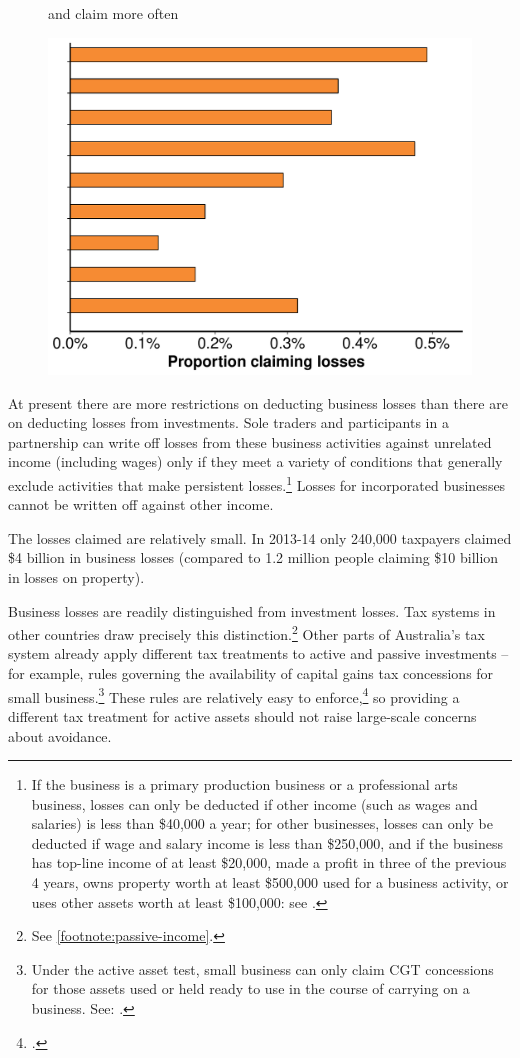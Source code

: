 \begin{figure}[t]
\caption*{and claim more often}
\includegraphics[width=0.8\columnwidth]{CGT-NG-atlas/Proportions-PP-losses-1.pdf}
\caption*{}
\end{figure}

At present there are more restrictions on deducting business losses than there are on deducting losses from investments. Sole traders and participants in a partnership can write off losses from these business activities against unrelated income (including wages) only if they meet a variety of conditions that generally exclude activities that make persistent losses.\footnote{If the business is a primary production business or a professional arts business, losses can only be deducted if other income (such as wages and salaries) is less than \$40,000 a year; for other businesses, losses can only be deducted if wage and salary income is less than \$250,000, and if the business has top-line income of at least \$20,000, made a profit in three of the previous 4 years, owns property worth at least \$500,000 used for a business activity, or uses other assets worth at least \$100,000: see \textcite{ATO2015OffsettingCurrentYearLosses}.} Losses for incorporated businesses cannot be written off against other income. 

The losses claimed are relatively small. In 2013-14 only 240,000 taxpayers claimed \$4 billion in business losses (compared to 1.2 million people claiming \$10 billion in losses on property).\label{insec:number-taxpayers-claiming-business-losses}

Business losses are readily distinguished from investment losses. Tax systems in other countries draw precisely this distinction.\footnote{See \stopifendnote{}\vref{footnote:passive-income}.} Other parts of Australia’s tax system already apply different tax treatments to active and passive investments – for example, rules governing the availability of capital gains tax concessions for small business.\footnote{Under the active asset test, small business can only claim CGT concessions for those assets used or held ready to use in the course of carrying on a business. See: \textcite{ATO2015ActiveAssetTest}.} These rules are relatively easy to enforce,\footcite{Mather2016} so providing a different tax treatment for active assets should not raise large-scale concerns about avoidance. 

